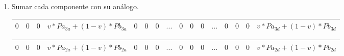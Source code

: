 \begin{enumerate}
Multiplicar los componentes de pixel correspondientes a B por 1-v. Preparamos un registro con cuatro dwords de valor 1-v (como hicimos previamente) para poder multiplicar ambos registros y obtener como resultado lo siguiente:

\begin{tabular}{| g | g | g | g | g | g | g | g | g | g | g | g | g | g | g | g |}
\hline
$0$ & $0$ & $0$ & $(1-v) * Pb_{3a}$ & $0$ & $0$ & $0$ & $(1-v) * Pb_{3b}$ & $0$ & $0$ & $0$ & $(1-v) * Pb_{3c}$ & $0$ & $0$ & $0$ & $(1-v) * Pb_{3d}$ \\ 
\hline
\end{tabular}

\begin{tabular}{| g | g | g | g | g | g | g | g | g | g | g | g | g | g | g | g |}
\hline
$0$ & $0$ & $0$ & $(1-v) * Pb_{2a}$ & $0$ & $0$ & $0$ & $(1-v) * Pb_{2b}$ & $0$ & $0$ & $0$ & $(1-v) * Pb_{2c}$ & $0$ & $0$ & $0$ & $(1-v) * Pb_{2d}$ \\ 
\hline
\end{tabular}

\begin{tabular}{| g | g | g | g | g | g | g | g | g | g | g | g | g | g | g | g |}
\hline
$0$ & $0$ & $0$ & $(1-v) * Pb_{1a}$ & $0$ & $0$ & $0$ & $(1-v) * Pb_{1b}$ & $0$ & $0$ & $0$ & $(1-v) * Pb_{1c}$ & $0$ & $0$ & $0$ & $(1-v) * Pb_{1d}$\\ 
\hline
\end{tabular}

\begin{tabular}{| g | g | g | g | g | g | g | g | g | g | g | g | g | g | g | g |}
\hline
$0$ & $0$ & $0$ & $(1-v) * Pb_{0a}$ & $0$ & $0$ & $0$ & $(1-v) * Pb_{0b}$ & $0$ & $0$ & $0$ & $(1-v) * Pb_{0c}$ & $0$ & $0$ & $0$ & $(1-v) * Pb_{0d}$ \\ 
\hline
\end{tabular}

\item Sumar cada componente con su análogo. \\
\footnotesize
\begin{tabular}{| o | o | o | o | o | o | o | o | o | o | o | o | o | o | o | o |} %
\hline
$0$ & $0$ & $0$ & $v * Pa_{3a} + (1-v) * Pb_{3a}$ & $0$ & $0$ & $0$ & $...$ & $0$ & $0$ & $0$ & $...$ & $0$ & $0$ & $0$ & $v * Pa_{3d} + (1-v) * Pb_{3d}$ \\ 
\hline
\end{tabular}

\begin{tabular}{| o | o | o | o | o | o | o | o | o | o | o | o | o | o | o | o |} %
\hline
$0$ & $0$ & $0$ & $v * Pa_{2a} + (1-v) * Pb_{2a}$ & $0$ & $0$ & $0$ & $...$ & $0$ & $0$ & $0$ & $...$ & $0$ & $0$ & $0$ & $v * Pa_{2d} + (1-v) * Pb_{2d}$ \\ 
\hline
\end{tabular}


\end{enumerate}

